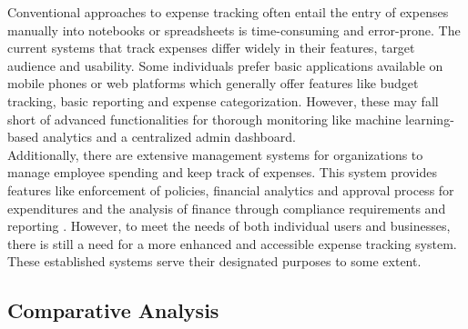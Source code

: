 \documentclass[12pt]{article}
\begin{document}
\noindent
\normalsize Conventional approaches to expense tracking often entail the entry of expenses manually into notebooks or spreadsheets is time-consuming and error-prone. The current systems that track expenses differ widely in their features, target audience and usability\cite{manchanda2012expense}. Some individuals prefer basic applications available on mobile phones or web platforms which generally offer features like budget tracking, basic reporting and expense categorization. However, these may fall short of advanced functionalities for thorough monitoring like machine learning-based analytics and a centralized admin dashboard. \\
Additionally, there are extensive management systems for organizations to manage employee spending and keep track of expenses. This system provides features like enforcement of policies, financial analytics and approval process for expenditures and the analysis of finance through compliance requirements and reporting \cite{velmurugan2020expense}. However, to meet the needs of both individual users and businesses, there is still a need for a more enhanced and accessible expense tracking system. These established systems serve their designated purposes to some extent.
\newpage
\vspace{1cm} %

\noindent
\subsection{Comparative Analysis}

\vspace{0.5cm}
\end{document}
